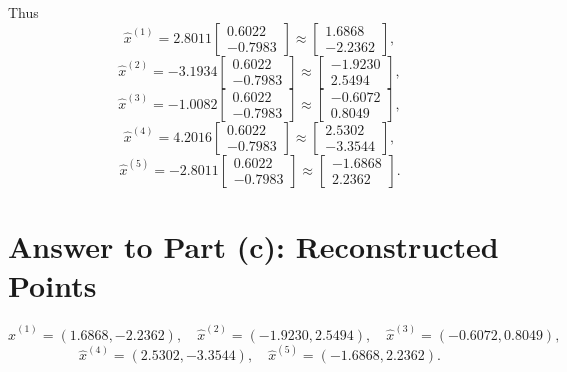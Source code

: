 \documentclass[11pt]{article}
\begin{document}
Thus
\[
    \hat{x}^{(1)}
    =
    2.8011
    \begin{bmatrix}
        0.6022\\
        -0.7983
    \end{bmatrix}
    \approx
    \begin{bmatrix}
        1.6868\\
        -2.2362
    \end{bmatrix},
\]
\[
    \hat{x}^{(2)}
    =
    -3.1934
    \begin{bmatrix}
        0.6022\\
        -0.7983
    \end{bmatrix}
    \approx
    \begin{bmatrix}
        -1.9230\\
        2.5494
    \end{bmatrix},
\]
\[
    \hat{x}^{(3)}
    =
    -1.0082
    \begin{bmatrix}
        0.6022\\
        -0.7983
    \end{bmatrix}
    \approx
    \begin{bmatrix}
        -0.6072\\
        0.8049
    \end{bmatrix},
\]
\[
    \hat{x}^{(4)}
    =
    4.2016
    \begin{bmatrix}
        0.6022\\
        -0.7983
    \end{bmatrix}
    \approx
    \begin{bmatrix}
        2.5302\\
        -3.3544
    \end{bmatrix},
\]
\[
    \hat{x}^{(5)}
    =
    -2.8011
    \begin{bmatrix}
        0.6022\\
        -0.7983
    \end{bmatrix}
    \approx
    \begin{bmatrix}
        -1.6868\\
        2.2362
    \end{bmatrix}.
\]

\section*{Answer to Part (c): Reconstructed Points}

\[
    \boxed{
    \hat{x}^{(1)}=(1.6868,-2.2362),\quad
    \hat{x}^{(2)}=(-1.9230,2.5494),\quad
    \hat{x}^{(3)}=(-0.6072,0.8049),}
\]
\[
    \boxed{
    \hat{x}^{(4)}=(2.5302,-3.3544),\quad
    \hat{x}^{(5)}=(-1.6868,2.2362).}
\]
\end{document}
